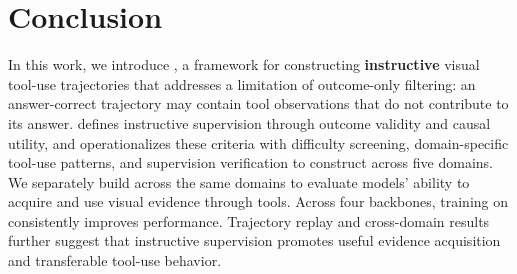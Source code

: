 \section{Conclusion}
\label{sec:conclusion}
In this work, we introduce \method, a framework for constructing \textbf{instructive} visual tool-use trajectories that addresses a limitation of outcome-only filtering: an answer-correct trajectory may contain tool observations that do not contribute to its answer. \method defines instructive supervision through outcome validity and causal utility, and operationalizes these criteria with difficulty screening, domain-specific tool-use patterns, and supervision verification to construct \dataset across five domains. We separately build \benchname across the same domains to evaluate models' ability to acquire and use visual evidence through tools. Across four backbones, training on \dataset consistently improves performance. Trajectory replay and cross-domain results further suggest that instructive supervision promotes useful evidence acquisition and transferable tool-use behavior.
